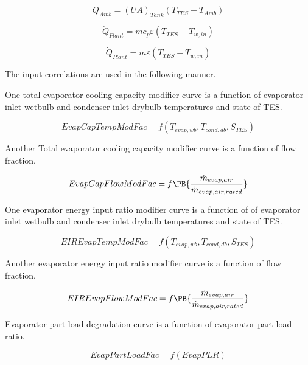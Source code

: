 \begin{equation}
{\dot Q_{Amb}} = {\left( {UA} \right)_{Tank}}\left( {{T_{TES}} - {T_{Amb}}} \right)
\end{equation}

\begin{equation}
  {\dot Q_{Plant}} = \dot m{c_p}\varepsilon \left( {{T_{TES}} - {T_{w,in}}} \right)
\end{equation}

\begin{equation}
  {\dot Q_{Plant}} = \dot m\varepsilon \left( {{T_{TES}} - {T_{w,in}}} \right)
\end{equation}

The input correlations are used in the following manner.

One total evaporator cooling capacity modifier curve is a function of evaporator inlet wetbulb and condenser inlet drybulb temperatures and state of TES.

\begin{equation}
EvapCapTempModFac = f\left( {{T_{evap,wb}},{T_{cond,db}},{S_{TES}}} \right)
\end{equation}

Another Total evaporator cooling capacity modifier curve is a function of flow fraction.

\begin{equation}
EvapCapFlowModFac = f\PB{\frac{\dot{m}_{evap,air}}{\dot{m}_{evap,air,rated}}}
\end{equation}

One evaporator energy input ratio modifier curve is a function of of evaporator inlet wetbulb and condenser inlet drybulb temperatures and state of TES.

\begin{equation}
EIREvapTempModFac = f\left( {{T_{evap,wb}},{T_{cond,db}},{S_{TES}}} \right)
\end{equation}

Another evaporator energy input ratio modifier curve is a function of flow fraction.

\begin{equation}
EIREvapFlowModFac = f\PB{\frac{\dot{m}_{evap,air}}{\dot{m}_{evap,air,rated}}}
\end{equation}

Evaporator part load degradation curve is a function of evaporator part load ratio.

\begin{equation}
EvapPartLoadFac = f\left( {EvapPLR} \right)
\end{equation}

